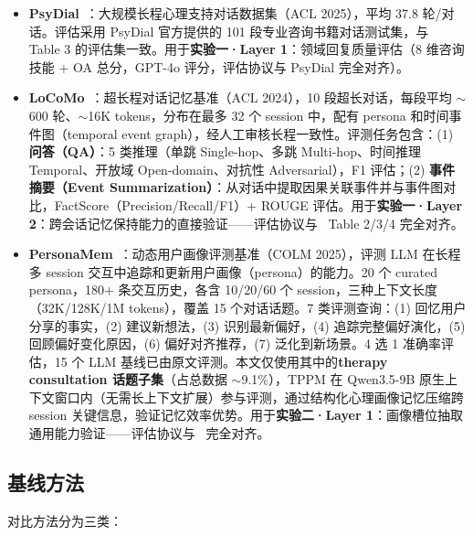 \documentclass[12pt,a4paper]{article}
\begin{document}
\begin{itemize}
  \item \textbf{PsyDial}~\cite{qiu2025psydial}：大规模长程心理支持对话数据集（ACL 2025），平均 37.8 轮/对话。评估采用 PsyDial 官方提供的 101 段专业咨询书籍对话测试集，与~\cite{qiu2025psydial} Table 3 的评估集一致。用于\textbf{实验一·Layer 1}：领域回复质量评估（8 维咨询技能 + OA 总分，GPT-4o 评分，评估协议与 PsyDial 完全对齐）。

  \item \textbf{LoCoMo}~\cite{maharana2024locomo}：超长程对话记忆基准（ACL 2024），10 段超长对话，每段平均 $\sim$600 轮、$\sim$16K tokens，分布在最多 32 个 session 中，配有 persona 和时间事件图（temporal event graph），经人工审核长程一致性。评测任务包含：(1) \textbf{问答（QA）}：5 类推理（单跳 Single-hop、多跳 Multi-hop、时间推理 Temporal、开放域 Open-domain、对抗性 Adversarial），F1 评估；(2) \textbf{事件摘要（Event Summarization）}：从对话中提取因果关联事件并与事件图对比，FactScore（Precision/Recall/F1）+ ROUGE 评估。用于\textbf{实验一·Layer 2}：跨会话记忆保持能力的直接验证——评估协议与~\cite{maharana2024locomo} Table 2/3/4 完全对齐。

  \item \textbf{PersonaMem}~\cite{jiang2025personamem}：动态用户画像评测基准（COLM 2025），评测 LLM 在长程多 session 交互中追踪和更新用户画像（persona）的能力。20 个 curated persona，180+ 条交互历史，各含 10/20/60 个 session，三种上下文长度（32K/128K/1M tokens），覆盖 15 个对话话题。7 类评测查询：(1) 回忆用户分享的事实，(2) 建议新想法，(3) 识别最新偏好，(4) 追踪完整偏好演化，(5) 回顾偏好变化原因，(6) 偏好对齐推荐，(7) 泛化到新场景。4 选 1 准确率评估，15 个 LLM 基线已由原文评测。本文仅使用其中的\textbf{therapy consultation 话题子集}（占总数据 $\sim$9.1\%），TPPM 在 Qwen3.5-9B 原生上下文窗口内（无需长上下文扩展）参与评测，通过结构化心理画像记忆压缩跨 session 关键信息，验证记忆效率优势。用于\textbf{实验二·Layer 1}：画像槽位抽取通用能力验证——评估协议与~\cite{jiang2025personamem} 完全对齐。
\end{itemize}

\subsection{基线方法}

对比方法分为三类：
\end{document}
